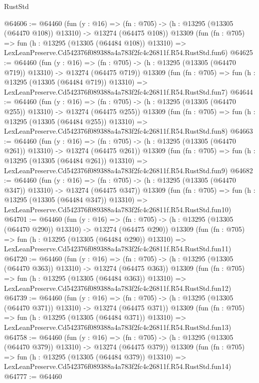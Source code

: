 \begin{lexlean}{RustStd}
\begin{coremodule}
@64606 := @64460
    (fun (y : @16) =>
    (fn : @705) -> (h : @13295 (@13305 (@64470 @108)) @13310) -> @13274 (@64475 @108))
    @13309
    (fun (fn : @705) =>
    fun (h : @13295 (@13305 (@64484 @108)) @13310) =>
    LexLeanPreserve.Cd542376f089388a4a783f2fc4c26811f.R54.RustStd.fun6)
@64625 := @64460
    (fun (y : @16) =>
    (fn : @705) -> (h : @13295 (@13305 (@64470 @719)) @13310) -> @13274 (@64475 @719))
    @13309
    (fun (fn : @705) =>
    fun (h : @13295 (@13305 (@64484 @719)) @13310) =>
    LexLeanPreserve.Cd542376f089388a4a783f2fc4c26811f.R54.RustStd.fun7)
@64644 := @64460
    (fun (y : @16) =>
    (fn : @705) -> (h : @13295 (@13305 (@64470 @255)) @13310) -> @13274 (@64475 @255))
    @13309
    (fun (fn : @705) =>
    fun (h : @13295 (@13305 (@64484 @255)) @13310) =>
    LexLeanPreserve.Cd542376f089388a4a783f2fc4c26811f.R54.RustStd.fun8)
@64663 := @64460
    (fun (y : @16) =>
    (fn : @705) -> (h : @13295 (@13305 (@64470 @261)) @13310) -> @13274 (@64475 @261))
    @13309
    (fun (fn : @705) =>
    fun (h : @13295 (@13305 (@64484 @261)) @13310) =>
    LexLeanPreserve.Cd542376f089388a4a783f2fc4c26811f.R54.RustStd.fun9)
@64682 := @64460
    (fun (y : @16) =>
    (fn : @705) -> (h : @13295 (@13305 (@64470 @347)) @13310) -> @13274 (@64475 @347))
    @13309
    (fun (fn : @705) =>
    fun (h : @13295 (@13305 (@64484 @347)) @13310) =>
    LexLeanPreserve.Cd542376f089388a4a783f2fc4c26811f.R54.RustStd.fun10)
@64701 := @64460
    (fun (y : @16) =>
    (fn : @705) -> (h : @13295 (@13305 (@64470 @290)) @13310) -> @13274 (@64475 @290))
    @13309
    (fun (fn : @705) =>
    fun (h : @13295 (@13305 (@64484 @290)) @13310) =>
    LexLeanPreserve.Cd542376f089388a4a783f2fc4c26811f.R54.RustStd.fun11)
@64720 := @64460
    (fun (y : @16) =>
    (fn : @705) -> (h : @13295 (@13305 (@64470 @363)) @13310) -> @13274 (@64475 @363))
    @13309
    (fun (fn : @705) =>
    fun (h : @13295 (@13305 (@64484 @363)) @13310) =>
    LexLeanPreserve.Cd542376f089388a4a783f2fc4c26811f.R54.RustStd.fun12)
@64739 := @64460
    (fun (y : @16) =>
    (fn : @705) -> (h : @13295 (@13305 (@64470 @371)) @13310) -> @13274 (@64475 @371))
    @13309
    (fun (fn : @705) =>
    fun (h : @13295 (@13305 (@64484 @371)) @13310) =>
    LexLeanPreserve.Cd542376f089388a4a783f2fc4c26811f.R54.RustStd.fun13)
@64758 := @64460
    (fun (y : @16) =>
    (fn : @705) -> (h : @13295 (@13305 (@64470 @379)) @13310) -> @13274 (@64475 @379))
    @13309
    (fun (fn : @705) =>
    fun (h : @13295 (@13305 (@64484 @379)) @13310) =>
    LexLeanPreserve.Cd542376f089388a4a783f2fc4c26811f.R54.RustStd.fun14)
@64777 := @64460

\end{coremodule}
\end{lexlean}
